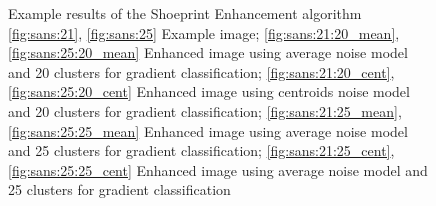 \documentclass[draft,final]{vutinfth} %
\begin{document}
\begin{figure}[h]
\caption{Example results of the Shoeprint Enhancement algorithm
				\ref{fig:sans:21}, \ref{fig:sans:25} Example image; \ref{fig:sans:21:20_mean}, \ref{fig:sans:25:20_mean} Enhanced image using average noise model and 20 clusters for gradient classification; \ref{fig:sans:21:20_cent}, \ref{fig:sans:25:20_cent} Enhanced image using centroids noise model and 20 clusters for gradient classification; \ref{fig:sans:21:25_mean}, \ref{fig:sans:25:25_mean} Enhanced image using average noise model and 25 clusters for gradient classification; \ref{fig:sans:21:25_cent}, \ref{fig:sans:25:25_cent} Enhanced image using average noise model and 25 clusters for gradient classification}
\label{fig:sans:res1}

\end{figure}

\end{document}
